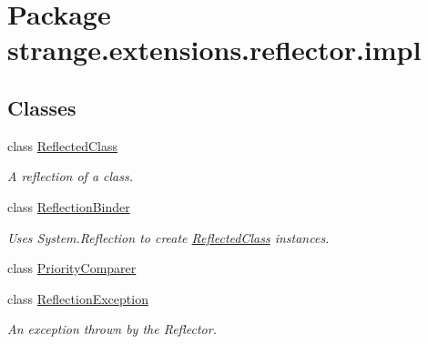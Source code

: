 \hypertarget{namespacestrange_1_1extensions_1_1reflector_1_1impl}{\section{Package strange.\-extensions.\-reflector.\-impl}
\label{namespacestrange_1_1extensions_1_1reflector_1_1impl}
}
\subsection*{Classes}
\begin{DoxyCompactItemize}
\item 
class \hyperlink{classstrange_1_1extensions_1_1reflector_1_1impl_1_1_reflected_class}{Reflected\-Class}
\begin{DoxyCompactList}\small\item\em A reflection of a class. \end{DoxyCompactList}\item 
class \hyperlink{classstrange_1_1extensions_1_1reflector_1_1impl_1_1_reflection_binder}{Reflection\-Binder}
\begin{DoxyCompactList}\small\item\em Uses System.\-Reflection to create {\ttfamily \hyperlink{classstrange_1_1extensions_1_1reflector_1_1impl_1_1_reflected_class}{Reflected\-Class}} instances. \end{DoxyCompactList}\item 
class \hyperlink{classstrange_1_1extensions_1_1reflector_1_1impl_1_1_priority_comparer}{Priority\-Comparer}
\item 
class \hyperlink{classstrange_1_1extensions_1_1reflector_1_1impl_1_1_reflection_exception}{Reflection\-Exception}
\begin{DoxyCompactList}\small\item\em An exception thrown by the Reflector. \end{DoxyCompactList}\end{DoxyCompactItemize}
